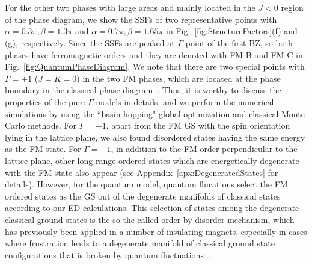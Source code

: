 \documentclass[aps,prb,reprint,amsfonts,amsmath,amssymb,showpacs,groupedaddress,superscriptaddress]{revtex4-1}
\begin{document}
For the other two phases with large areas and mainly located in the $J<0$ region of the phase diagram, we show the SSFs of two representative points with $\alpha=0.3\pi, \beta=1.3\pi$ and $\alpha=0.7\pi, \beta=1.65\pi$ in Fig.~\ref{fig:StructureFactors}(f) and (g), respectively. Since the SSFs are peaked at $\tilde{\Gamma}$ point of the first BZ, so both phases have ferromagnetic orders and they are denoted with FM-B and FM-C in Fig.~\ref{fig:QuantumPhaseDiagram}. We note that there are two special points with $\Gamma=\pm1$ ($J=K=0$) in the two FM phases, which are located at the phase boundary in the classical phase diagram~\cite{PhysRevB.92.165108}. Thus, it is worthy to discuss the properties of the pure $\Gamma$ models in details, and we perform the numerical simulations by using the ``basin-hopping" global optimization and classical Monte Carlo methods. For $\Gamma=+1$, apart from the FM GS with the spin orientation lying in the lattice plane, we also found disordered states having the same energy as the FM state. For $\Gamma=-1$, in addition to the FM order perpendicular to the lattice plane, other long-range ordered states which are energetically degenerate with the FM state also appear (see Appendix~\ref{apx:DegeneratedStates} for details). However, for the quantum model, quantum flucations select the FM ordered states as the GS out of the degenerate manifolds of classical states according to our ED calculations. This selection of states among the degenerate classical ground states is the so the called order-by-disorder mechanism, which has previously been applied in a number of insulating magnets, especially in cases where frustration leads to a degenerate manifold of classical ground state configurations that is broken by quantum fluctuations~\cite{JPSJ.54.4494,PhysRevLett.62.2056,PhysRevLett.88.067203,PhysRevB.81.214419,PhysRevLett.109.077204}.
\end{document}
